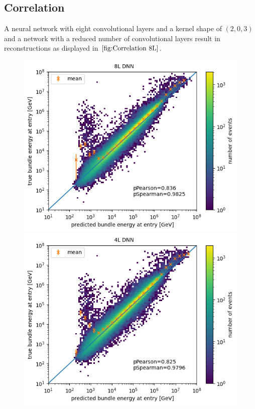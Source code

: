 \documentclass[
  tucolor,       %
  BCOR=12mm,     %
  parskip=half,  %
  open=any,      %
  cleardoublepage=plain,  %
]{tudothesis}
\begin{document}
\subsection{Correlation}
A neural network with eight convolutional layers and a kernel shape of $(2,0,3)$ and a network with a reduced number of convolutional layers result in reconstructions as displayed in $\ref{fig:Correlation 8L}$. 
\begin{figure}[h]
  \centering
  \begin{minipage}[t]{0.49\textwidth}
    \includegraphics[width=\textwidth]{Plots/Correlation bundle energy std DNN (8L)}
  \end{minipage}
  \begin{minipage}[t]{0.49\textwidth}
    \includegraphics[width=\textwidth]{Plots/Correlation bundle energy small DNN (4L)}

\end{minipage}
\end{figure}
\end{document}
